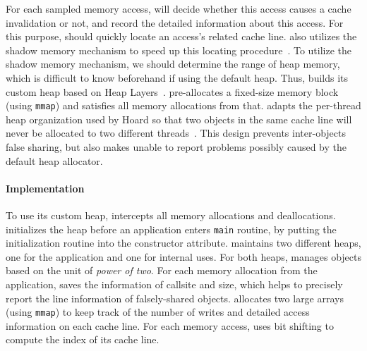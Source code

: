 For each sampled memory access, \cheetah{} will decide whether this access causes a cache invalidation or not, and record the detailed information about this access. For this purpose, \cheetah{} should quickly locate an access's related cache line. \Cheetah{} also utilizes the shadow memory mechanism to speed up this locating procedure~\cite{qinzhao, Predator}. 
To utilize the shadow memory mechanism, we should determine the range of heap memory, which is difficult to know beforehand if using the default heap. Thus, \cheetah{} builds its custom heap based on Heap Layers~\cite{Berger:2001:CHM:378795.378821}. \cheetah{} pre-allocates a fixed-size memory block (using \texttt{mmap}) and satisfies all memory allocations from that. \cheetah{} adapts the per-thread heap organization used by Hoard so that two objects in the same cache line will never be allocated to two different threads~\cite{Hoard}. This design prevents inter-objects false sharing, but also makes \cheetah{}  unable to report problems possibly caused by the default heap allocator.  

\paragraph{Implementation} 
To use its custom heap, \cheetah{} intercepts all memory allocations and deallocations. \cheetah{} initializes the heap before an application enters \texttt{main} routine, by putting the initialization routine into the constructor attribute. \cheetah{} maintains two different heaps, one for the application and one for internal uses. For both heaps, \cheetah{} manages objects based on the unit of {\it power of two}. For each memory allocation from the application, \cheetah{} saves the information of callsite and size, which helps \cheetah{} to precisely report the line information of falsely-shared objects.  
\Cheetah{} allocates two large arrays (using \texttt{mmap}) to keep track of the number of writes and detailed access information on each cache line. For each memory access, \cheetah{} uses bit shifting to compute the index of its cache line. 


